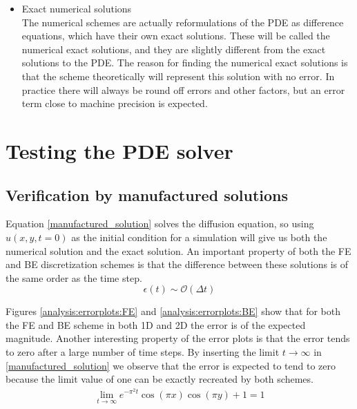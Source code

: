 \begin{itemize}
  \item Exact numerical solutions \\
  The numerical schemes are actually reformulations of the PDE as difference equations, which have their own exact solutions. 
  These will be called the numerical exact solutions, and they are slightly different from the exact solutions to the PDE. 
  The reason for finding the numerical exact solutions is that the scheme theoretically will represent this solution with no error. 
  In practice there will always be round off errors and other factors, but an error term close to machine precision is expected.
\end{itemize}

\section{Testing the PDE solver}


\subsection{Verification by manufactured solutions}

Equation \eqref{manufactured_solution} solves the diffusion equation, so using $u(x,y,t=0)$ as the initial condition for a simulation will give us both the numerical solution and the exact solution. 
An important property of both the FE and BE discretization schemes is that the difference between these solutions is of the same order as the time step.
\begin{equation*}
 \epsilon(t) \sim \mathcal{O}(\Delta t)
\end{equation*}

Figures \ref{analysis:errorplots:FE} and \ref{analysis:errorplots:BE} show that for both the FE and BE scheme in both 1D and 2D the error is of the expected magnitude. 
Another interesting property of the error plots is that the error tends to zero after a large number of time steps. 
By inserting the limit $t\to\infty$ in \eqref{manufactured_solution} we observe that the error is expected to tend to zero because the limit value of one can be exactly recreated by both schemes.
\begin{align*}
 \lim_{t\to\infty} e^{-\pi^2t}\cos(\pi x)\cos(\pi y) +1 = 1
\end{align*}

